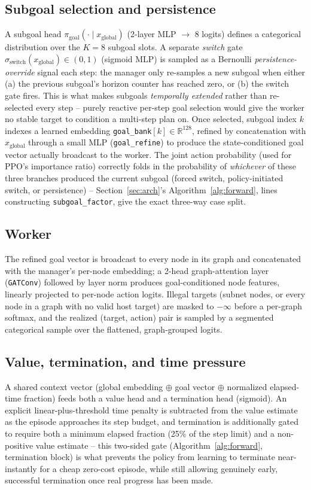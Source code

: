 \documentclass[11pt]{article}
\newcommand{\code}[1]{\texttt{#1}}
\begin{document}
\subsection{Subgoal selection and persistence}
A subgoal head $\pi_{\text{goal}}(\cdot\mid x_{\text{global}})$
(2-layer MLP $\to$ 8 logits) defines a categorical distribution over the
$K{=}8$ subgoal slots. A separate \emph{switch} gate
$\sigma_{\text{switch}}(x_{\text{global}}) \in (0,1)$ (sigmoid MLP) is sampled as a
Bernoulli \emph{persistence-override} signal each step: the manager only re-samples a
new subgoal when either (a) the previous subgoal's horizon counter has reached zero,
or (b) the switch gate fires. This is what makes subgoals \emph{temporally extended}
rather than re-selected every step -- purely reactive per-step goal selection would
give the worker no stable target to condition a multi-step plan on. Once selected,
subgoal index $k$ indexes a learned embedding \code{goal\_bank}$[k] \in
\mathbb{R}^{128}$, refined by concatenation with $x_{\text{global}}$ through a small
MLP (\code{goal\_refine}) to produce the state-conditioned goal vector actually
broadcast to the worker. The joint action probability (used for PPO's importance
ratio) correctly folds in the probability of \emph{whichever} of these three
branches produced the current subgoal (forced switch, policy-initiated switch, or
persistence) -- Section~\ref{sec:arch}'s Algorithm~\ref{alg:forward}, lines
constructing \code{subgoal\_factor}, give the exact three-way case split.

\subsection{Worker}
The refined goal vector is broadcast to every node in its graph and concatenated
with the manager's per-node embedding; a 2-head graph-attention layer
(\code{GATConv}) followed by layer norm produces goal-conditioned node features,
linearly projected to per-node action logits. Illegal targets (subnet nodes, or
every node in a graph with no valid host target) are masked to $-\infty$ before a
per-graph softmax, and the realized (target, action) pair is sampled by a segmented
categorical sample over the flattened, graph-grouped logits.

\subsection{Value, termination, and time pressure}
A shared context vector (global embedding $\oplus$ goal vector $\oplus$ normalized
elapsed-time fraction) feeds both a value head and a termination head (sigmoid). An
explicit linear-plus-threshold time penalty is subtracted from the value estimate as
the episode approaches its step budget, and termination is additionally gated to
require both a minimum elapsed fraction (25\% of the step limit) and a non-positive
value estimate -- this two-sided gate (Algorithm~\ref{alg:forward}, termination
block) is what prevents the policy from learning to terminate near-instantly for a
cheap zero-cost episode, while still allowing genuinely early, successful
termination once real progress has been made.
\end{document}
